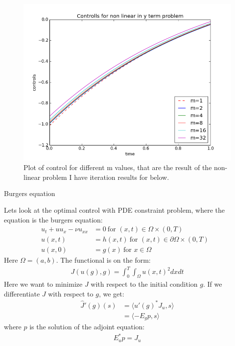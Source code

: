 \documentclass[11pt,a4paper]{report}
\begin{document}
\begin{figure}
  \includegraphics[width=\linewidth]{non_linY.png}
  \caption{Plot of control for different m values, that are the result of the non-linear problem I have iteration results for below. }
  \label{Fig 7}
\end{figure}
\begin{center}


\LARGE Burgers equation


\end{center}
Lets look at the optimal control with PDE constraint problem, where the equation is the burgers equation:
\begin{align*}
u_t + uu_x - \nu u_{xx} &= 0 \ \text{for $(x,t)\in \Omega\times(0,T)$}\\
u(x,t) &= h(x,t) \ \text{for $(x,t) \in\partial\Omega\times(0,T)$ } \\
u(x,0) &= g(x) \ \text{for $x \in\Omega$ }
\end{align*} 
Here $\Omega = (a,b)$. The functional is on the form:
\begin{align*}
J(u(g),g) = \int_0^T\int_{\Omega} u(x,t)^2 dxdt
\end{align*}
Here we want to minimize $J$ with respect to the initial condition $g$. If we differentiate $J$ with respect to $g$, we get:
\begin{align*}
\hat{J}'(g)(s) &= \langle u'(g)^*J_u,s \rangle \\
&= \langle -E_gp,s \rangle
\end{align*}
where $p$ is the solution of the adjoint equation:
\begin{align*}
E_u^*p = J_u
\end{align*}
\end{document}
